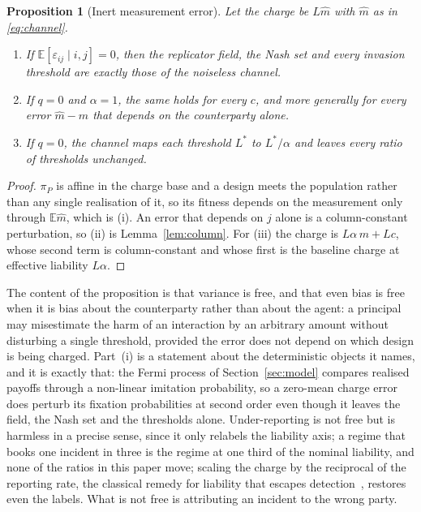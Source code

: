 \documentclass[11pt,a4paper]{article}
\newtheorem{proposition}[theorem]{Proposition}
\theoremstyle{definition}
\newcommand{\piP}{\pi_{P}}
\begin{document}
\begin{proposition}[Inert measurement error]\label{prop:inertmeasure}
Let the charge be $L\hat m$ with $\hat m$ as in \eqref{eq:channel}.
\begin{enumerate}
\item[(i)] If $\mathbb{E}[\varepsilon_{ij}\mid i,j]=0$, then the replicator
field, the Nash set and every invasion threshold are exactly those of the
noiseless channel.
\item[(ii)] If $q=0$ and $\alpha=1$, the same holds for every $c$, and more
generally for every error $\hat m-m$ that depends on the counterparty alone.
\item[(iii)] If $q=0$, the channel maps each threshold $L^{*}$ to
$L^{*}/\alpha$ and leaves every ratio of thresholds unchanged.
\end{enumerate}
\end{proposition}

\begin{proof}
$\piP$ is affine in the charge base and a design meets the population rather
than any single realisation of it, so its fitness depends on the measurement
only through $\mathbb{E}\hat m$, which is (i). An error that depends on $j$
alone is a column-constant perturbation, so (ii) is
Lemma~\ref{lem:column}. For (iii) the charge is $L\alpha\,m+Lc$, whose second
term is column-constant and whose first is the baseline charge at effective
liability $L\alpha$.
\end{proof}

The content of the proposition is that variance is free, and that even bias is
free when it is bias about the counterparty rather than about the agent: a
principal may misestimate the harm of an interaction by an arbitrary amount
without disturbing a single threshold, provided the error does not depend on
which design is being charged. Part~(i) is a statement about the deterministic
objects it names, and it is exactly that: the Fermi process of
Section~\ref{sec:model} compares realised payoffs through a non-linear
imitation probability, so a zero-mean charge error does perturb its fixation
probabilities at second order even though it leaves the field, the Nash set
and the thresholds alone. Under-reporting is not free but is harmless in
a precise sense, since it only relabels the liability axis; a regime that
books one incident in three is the regime at one third of the nominal
liability, and none of the ratios in this paper move; scaling the charge by
the reciprocal of the reporting rate, the classical remedy for liability that
escapes detection~\citep{polinsky1998punitive}, restores even the labels. What
is not free is
attributing an incident to the wrong party.
\end{document}
